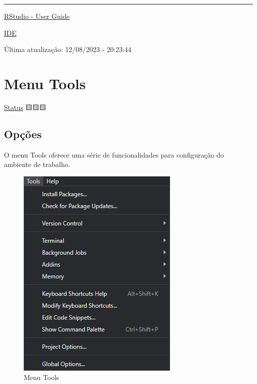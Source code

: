 \documentclass[
  letterpaper,
  DIV=11,
  numbers=noendperiod]{scrreprt}
\begin{document}
\begin{center}\rule{0.5\linewidth}{0.5pt}\end{center}

\href{https://docs.posit.co/ide/user/}{RStudio - User Guide}

\href{https://en.wikipedia.org/wiki/Integrated_development_environment}{IDE}

Última atualização: 12/08/2023 - 20:23:44

\hypertarget{menu-tools}{%
\chapter{Menu Tools}\label{menu-tools}}

\protect\hyperlink{status-do-material}{Status} 🟨🟨🟨

\hypertarget{opuxe7uxf5es}{%
\section{Opções}\label{opuxe7uxf5es}}

O menu Tools oferece uma série de funcionalidades para configuração do
ambiente de trabalho.

\begin{figure}

{\centering \includegraphics{./images/rstudio/menu_tools.png}

}

\caption{\label{fig-rstudio-menu-tools}Menu Tools}

\end{figure}
\end{document}
